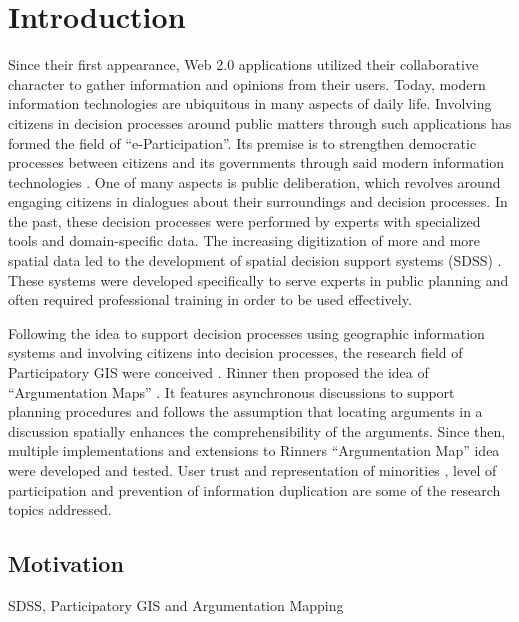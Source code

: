 \section{Introduction}
Since their first appearance, Web 2.0 applications utilized their collaborative character to gather information and opinions from their users. Today, modern information technologies are ubiquitous in many aspects of daily life. Involving citizens in decision processes around public matters through such applications has formed the field of ``e-Participation''. Its premise is to strengthen democratic processes between citizens and its governments through said modern information technologies \cite{Saebo_eParticipation, Medaglia2012_eParticipation}. One of many aspects is public deliberation, which revolves around engaging citizens in dialogues about their surroundings and decision processes. In the past, these decision processes were performed by experts with specialized tools and domain-specific data. The increasing digitization of more and more spatial data led to the development of spatial decision support systems (SDSS) \cite{densham_sdss}. These systems were developed specifically to serve experts in public planning and often required professional training in order to be used effectively.

Following the idea to support decision processes using geographic information systems and involving citizens into decision processes, the research field of Participatory GIS were conceived \cite{Macintosh2004_eParticipation_characterization,Sieber2006_PublicParticipationGIS}. Rinner then proposed the idea of ``Argumentation Maps'' \cite{Rinner_ArgumentationMaps}. It features asynchronous discussions to support planning procedures and follows the assumption that locating arguments in a discussion spatially enhances the comprehensibility of the arguments. Since then, multiple implementations and extensions to Rinners ``Argumentation Map'' idea were developed and tested. User trust and representation of minorities \cite{Carver2001_PPGIS_Cyberdemocracy}, level of participation \cite{Steinmann2005_Combination_Ladder_GIS} and prevention of information duplication \cite{Hopfer2007_Communication} are some of the research topics addressed.

\subsection{Motivation}

SDSS, Participatory GIS and Argumentation Mapping